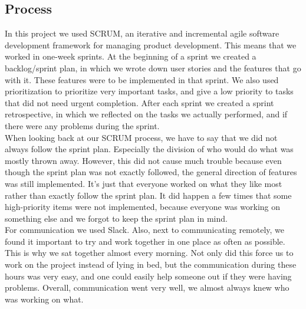 \subsection*{Process}
In this project we used SCRUM, an iterative and incremental agile software development framework for managing product development. This means that we worked in one-week sprints. At the beginning of a sprint we created a backlog/sprint plan, in which we wrote down user stories and the features that go with it. These features were to be implemented in that sprint. We also used prioritization to prioritize very important tasks, and give a low priority to tasks that did not need urgent completion. After each sprint we created a sprint retrospective, in which we reflected on the tasks we actually performed, and if there were any problems during the sprint.\\
When looking back at our SCRUM process, we have to say that we did not always follow the sprint plan. Especially the division of who would do what was mostly thrown away. However, this did not cause much trouble because even though the sprint plan was not exactly followed, the general direction of features was still implemented. It's just that everyone worked on what they like most rather than exactly follow the sprint plan. It did happen a few times that some high-priority items were not implemented, because everyone was working on something else and we forgot to keep the sprint plan in mind.\\
For communication we used Slack. Also, next to communicating remotely, we found it important to try and work together in one place as often as possible. This is why we sat together almost every morning. Not only did this force us to work on the project instead of lying in bed, but the communication during these hours was very easy, and one could easily help someone out if they were having problems. Overall, communication went very well, we almost always knew who was working on what.
